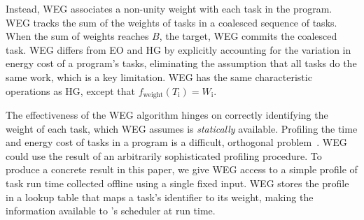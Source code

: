 Instead, WEG associates a non-unity weight with each task in the program. WEG tracks the sum of the weights of tasks in a coalesced sequence of tasks. When the sum of weights reaches $B$, the target, WEG commits the coalesced task. WEG differs from EO and HG by explicitly accounting for the variation in energy cost of a program's tasks, eliminating the assumption that all tasks do the same work, which is a key limitation. WEG has the same characteristic operations as HG, except that $f_\text{weight}(T_\text{i}) = W_\text{i}$.

The effectiveness of the WEG algorithm hinges on correctly identifying the weight of each task, which WEG assumes is {\em statically} available. Profiling the time and energy cost of tasks in a program is a difficult, orthogonal problem~\cite{cleancut_2018,baghsorkhi_cgo_2018}. WEG could use the result of an arbitrarily sophisticated profiling procedure. To produce a concrete result in this paper, we give WEG access to a simple profile of task run time collected offline using a single fixed input. WEG stores the profile in a lookup table that maps a task's identifier to its weight, making the information available to \sys's scheduler at run time.